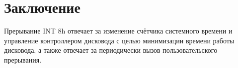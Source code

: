 \section*{Заключение}

Прерывание INT 8h отвечает за изменение счётчика системного времени и управление контроллером дисковода с целью минимизации времени работы дисковода, а также отвечает за периодически вызов пользовательского прерывания.
